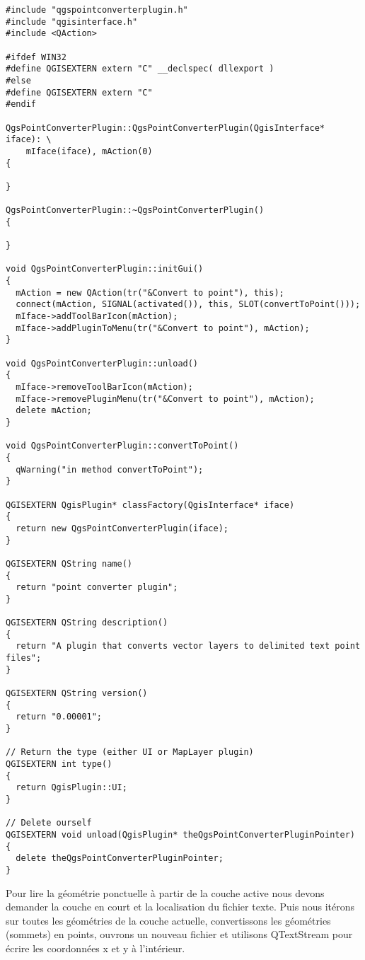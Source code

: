 \begin{verbatim}
#include "qgspointconverterplugin.h"
#include "qgisinterface.h"
#include <QAction>

#ifdef WIN32
#define QGISEXTERN extern "C" __declspec( dllexport )
#else
#define QGISEXTERN extern "C"
#endif

QgsPointConverterPlugin::QgsPointConverterPlugin(QgisInterface* iface): \
    mIface(iface), mAction(0)
{

}

QgsPointConverterPlugin::~QgsPointConverterPlugin()
{

}

void QgsPointConverterPlugin::initGui()
{
  mAction = new QAction(tr("&Convert to point"), this);
  connect(mAction, SIGNAL(activated()), this, SLOT(convertToPoint()));
  mIface->addToolBarIcon(mAction);
  mIface->addPluginToMenu(tr("&Convert to point"), mAction);
}

void QgsPointConverterPlugin::unload()
{
  mIface->removeToolBarIcon(mAction);
  mIface->removePluginMenu(tr("&Convert to point"), mAction);
  delete mAction;
}

void QgsPointConverterPlugin::convertToPoint()
{
  qWarning("in method convertToPoint");
}

QGISEXTERN QgisPlugin* classFactory(QgisInterface* iface)
{
  return new QgsPointConverterPlugin(iface);
}

QGISEXTERN QString name()
{
  return "point converter plugin";
}

QGISEXTERN QString description()
{
  return "A plugin that converts vector layers to delimited text point files";
}

QGISEXTERN QString version()
{
  return "0.00001";
}

// Return the type (either UI or MapLayer plugin)
QGISEXTERN int type()
{
  return QgisPlugin::UI;
}

// Delete ourself
QGISEXTERN void unload(QgisPlugin* theQgsPointConverterPluginPointer)
{
  delete theQgsPointConverterPluginPointer;
}
\end{verbatim}



Pour lire la géométrie ponctuelle à partir de la couche active nous devons 
demander la couche en court et la localisation du fichier texte. Puis nous 
itérons sur toutes les géométries de la couche actuelle, convertissons les 
géométries (sommets) en points, ouvrons un nouveau fichier et utilisons 
QTextStream pour écrire les coordonnées x et y à l'intérieur.

